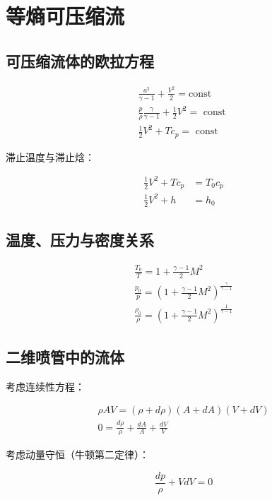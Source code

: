 \section{等熵可压缩流}

\subsection{可压缩流体的欧拉方程}

\begin{gather*}
    \frac{a^{2}}{\gamma-1}+\frac{V^{2}}{2}=\mathrm{const}\\
    \frac{p}{\rho} \frac{\gamma}{\gamma-1}+\frac{1}{2} V^{2}=\text { const }\\ 
    \frac{1}{2} V^{2}+T c_{p}=\text { const }
\end{gather*}

滞止温度与滞止焓：

\begin{align*}
    \frac{1}{2} V^{2}+T c_{p}&=T_{0} c_{p}\\ 
    \frac{1}{2} V^{2}+h&=h_{0}
\end{align*}

\subsection{温度、压力与密度关系}

\begin{gather*}
    \frac{T_{0}}{T}=1+\frac{\gamma-1}{2} M^{2}\\ 
    \frac{p_{0}}{p}=\left(1+\frac{\gamma-1}{2} M^{2}\right)^{\frac{\gamma}{\gamma-1}}\\ 
    \frac{\rho_{0}}{\rho}=\left(1+\frac{\gamma-1}{2} M^{2}\right)^{\frac{1}{\gamma-1}}
\end{gather*}

\subsection{二维喷管中的流体}

考虑连续性方程：

\begin{gather*}
    \rho A V=(\rho+d \rho)(A+d A)(V+d V)\\ 
    0=\frac{d \rho}{\rho}+\frac{d A}{A}+\frac{d V}{V}
\end{gather*}

考虑动量守恒（牛顿第二定律）：

\begin{equation*}
    \frac{d p}{\rho}+V d V=0
\end{equation*}

